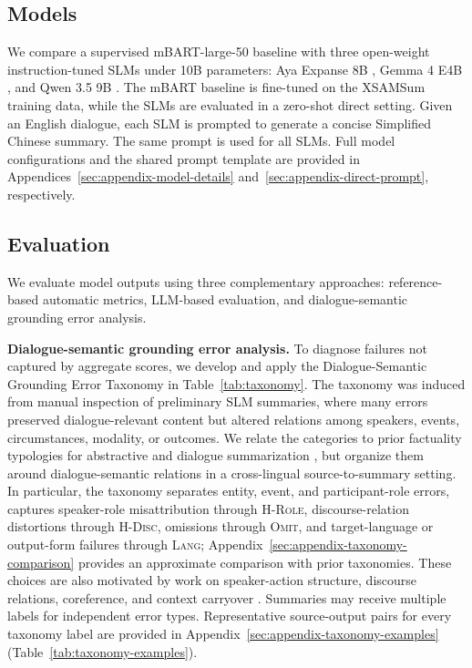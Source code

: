 \documentclass[11pt]{article}
\begin{document}
\subsection{Models}

We compare a supervised mBART-large-50 baseline \citep{liu-etal-2020-multilingual-denoising,tang-etal-2021-multilingual} with three open-weight instruction-tuned SLMs under 10B parameters: Aya Expanse 8B \citep{dang2024ayaexpansecombiningresearch}, Gemma 4 E4B \citep{gemma4_2026}, and Qwen 3.5 9B \citep{qwen3.5}. The mBART baseline is fine-tuned on the XSAMSum training data, while the SLMs are evaluated in a zero-shot direct setting. Given an English dialogue, each SLM is prompted to generate a concise Simplified Chinese summary. The same prompt is used for all SLMs. Full model configurations and the shared prompt template are provided in Appendices~\ref{sec:appendix-model-details} and~\ref{sec:appendix-direct-prompt}, respectively.

\subsection{Evaluation}
We evaluate model outputs using three complementary approaches: reference-based automatic metrics, LLM-based evaluation, and dialogue-semantic grounding error analysis.

\noindent\textbf{Dialogue-semantic grounding error analysis.} To diagnose failures not captured by aggregate scores, we develop and apply the Dialogue-Semantic Grounding Error Taxonomy in Table~\ref{tab:taxonomy}. The taxonomy was induced from manual inspection of preliminary SLM summaries, where many errors preserved dialogue-relevant content but altered relations among speakers, events, circumstances, modality, or outcomes. We relate the categories to prior factuality typologies for abstractive and dialogue summarization \citep{pagnoni-etal-2021-understanding,tang-etal-2022-confit,wang-etal-2022-analyzing}, but organize them around dialogue-semantic relations in a cross-lingual source-to-summary setting. In particular, the taxonomy separates entity, event, and participant-role errors, captures speaker-role misattribution through \textsc{H-Role}, discourse-relation distortions through \textsc{H-Disc}, omissions through \textsc{Omit}, and target-language or output-form failures through \textsc{Lang}; Appendix~\ref{sec:appendix-taxonomy-comparison} provides an approximate comparison with prior taxonomies. These choices are also motivated by work on speaker-action structure, discourse relations, coreference, and context carryover \citep{chen-yang-2021-structure,aghajanyan-etal-2020-conversational}. Summaries may receive multiple labels for independent error types. Representative source-output pairs for every taxonomy label are provided in Appendix~\ref{sec:appendix-taxonomy-examples} (Table~\ref{tab:taxonomy-examples}).
\end{document}
